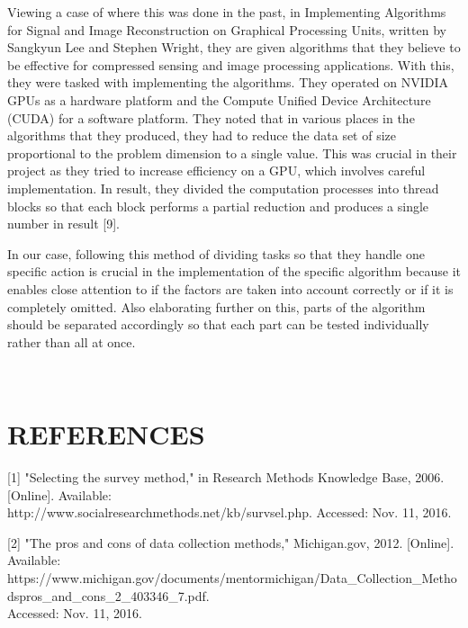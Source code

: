 \documentclass[a4,draftclsnofoot,onecolumn,margin=0.75,10pt]{IEEEtran}
\begin{document}
{   Viewing a case of where this was done in the past, in Implementing Algorithms for Signal and Image Reconstruction on Graphical Processing Units, written by Sangkyun Lee and Stephen Wright, they are given algorithms that they believe to be effective for compressed sensing and image processing applications. With this, they were tasked with implementing the algorithms. They operated on NVIDIA GPUs as a hardware platform and the Compute Unified Device Architecture (CUDA) for a software platform. They noted that in various places in the algorithms that they produced, they had to reduce the data set of size proportional to the problem dimension to a single value. This was crucial in their project as they tried to increase efficiency on a GPU, which involves careful implementation. In result, they divided the computation processes into thread blocks so that each block performs a partial reduction and produces a single number in result [9]. 
   
   In our case, following this method of dividing tasks so that they handle one specific action is crucial in the implementation of the specific algorithm because it enables close attention to if the factors are taken into account correctly or if it is completely omitted. Also elaborating further on this, parts of the algorithm should be separated accordingly so that each part can be tested individually rather than all at once.}

\bigskip

\bigskip

\bigskip





\iffalse
\clearpage\
\section[REFERENCES{}]
{\rmfamily\bfseries\color{black}
REFERENCES}

[1]	"Selecting the survey method," in Research Methods Knowledge Base, 2006. [Online]. Available:\\ http://www.socialresearchmethods.net/kb/survsel.php. Accessed: Nov. 11, 2016.
\par\null\par

[2]	"The pros and cons of data collection methods," Michigan.gov, 2012. [Online]. Available:\\ https://www.michigan.gov/documents/mentormichigan/Data\_Collection\_Methods\-\-pros\_and\_cons\_2\_403346\_7.pdf.\\ Accessed: Nov. 11, 2016.
\par\null\par
\end{document}
